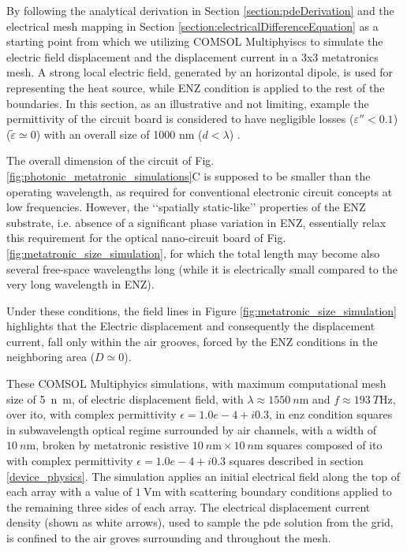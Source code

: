 \par By following the analytical derivation in Section \ref{section:pdeDerivation} and the electrical mesh mapping in Section \ref{section:electricalDifferenceEquation} as a starting point from which we utilizing COMSOL Multiphyiscs to simulate the electric field displacement and the displacement current in a 3x3 metatronics mesh. A strong local electric field, generated by an horizontal dipole, is used for representing the heat source, while ENZ condition is applied to the rest of the boundaries. In this section, as an illustrative and not limiting, example the permittivity of the circuit board is considered to have negligible losses ($\varepsilon''<0.1$) ($\widetilde{\varepsilon}\simeq0$) with an overall size of 1000 nm ($d<\lambda$) \cite{moitra_experimental_2014, li_-chip_2015}.

\par The overall dimension of the circuit of Fig. \ref{fig:photonic_metatronic_simulations}C is supposed to be smaller than the operating wavelength, as required for conventional electronic circuit concepts at low frequencies. However, the ‘‘spatially static-like’’ properties of the ENZ substrate, i.e. absence of a significant phase variation in ENZ, essentially relax this requirement for the optical nano-circuit board of Fig. \ref{fig:metatronic_size_simulation}, for which the total length may become also several free-space wavelengths long (while it is electrically small compared to the very long wavelength in ENZ).\cite{li_-chip_2015}

\par Under these conditions, the field lines in Figure \ref{fig:metatronic_size_simulation} highlights that the Electric displacement and consequently the displacement current, fall only within the air grooves, forced by the ENZ conditions in the neighboring area ($D\simeq0$). 

\par These COMSOL Multiphyics simulations, with maximum computational mesh size of \SI{5}{n\meter}, of electric displacement field, with $\lambda \approx \SI{1550}{n\meter} $ and $f \approx \SI{193}{T\hertz}$, over \acrfull{ito},  with complex permittivity $\epsilon = 1.0e-4 + i0.3$, in \acrfull{enz} condition squares in subwavelength optical regime surrounded by air channels, with a width of $\SI{10}{n\meter}$, broken by metatronic resistive $\SI{10}{n\meter} \times \SI{10}{n\meter}$ squares composed of \acrshort{ito} with complex permittivity $\epsilon = 1.0e-4 + i0.3$ squares described in section \ref{device_physics}. The simulation applies an initial electrical field along the top of each array with a value of $\SI{1}{\volt\meter}$ with scattering boundary conditions applied to the remaining three sides of each array. The electrical displacement current density (shown as white arrows), used to sample the \acrshort{pde} solution from the grid, is confined to the air groves surrounding and throughout the mesh.


